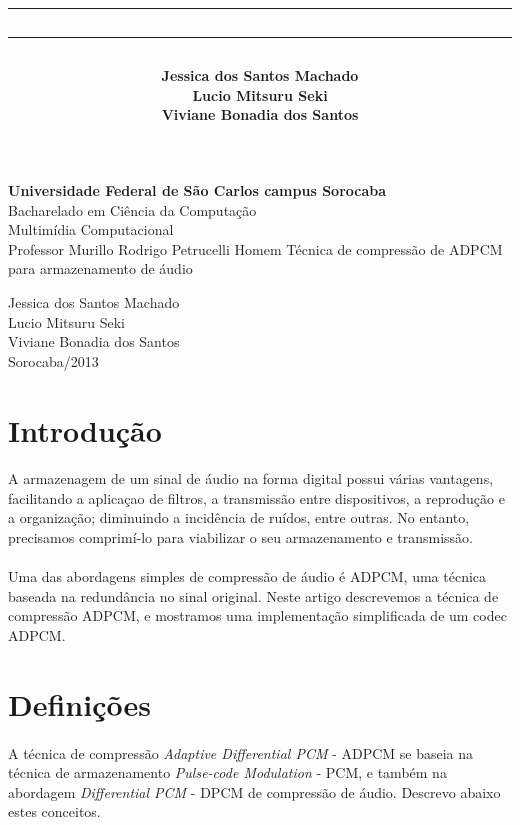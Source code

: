 \documentclass[a4paper,12pt]{article}
\title{\hrule\vspace{1pt}\hrule\vspace{25pt}}
\author{\LARGE \bf 
Jessica dos Santos Machado\\
Lucio Mitsuru Seki\\
Viviane Bonadia dos Santos}
\date{\Large \bf Janeiro de 2012 \vspace{25pt}\hrule\vspace{1pt}\hrule}
\begin{document}
\pagestyle{empty}
\onehalfspacing
\begin{center}
{\Large \bf Universidade Federal de São Carlos campus Sorocaba}\\[15pt]
{\Large Bacharelado em Ciência da Computação}\\[15pt]
{\Large Multimídia Computacional\\ Professor Murillo Rodrigo Petrucelli Homem}
\vfill
\vfill
{\Large Técnica de compressão de ADPCM para armazenamento de áudio}
\vfill
\vfill

{\Large Jessica dos Santos Machado\\
Lucio Mitsuru Seki\\
Viviane Bonadia dos Santos}\\
\bigskip
{Sorocaba/2013}
\end{center}

\newpage

\section{Introdução}

\paragraph{}
A armazenagem de um sinal de áudio na forma digital possui várias vantagens, facilitando a aplicaçao de filtros, a transmissão entre dispositivos, a reprodução e a organização; diminuindo a incidência de ruídos, entre outras. No entanto, precisamos comprimí-lo para viabilizar o seu armazenamento e transmissão.

\paragraph{}
Uma das abordagens simples de compressão de áudio é ADPCM, uma técnica baseada na redundância no sinal original. Neste artigo descrevemos a técnica de compressão ADPCM, e mostramos uma implementação simplificada de um codec ADPCM.

\section{Definições}

\paragraph{}
A técnica de compressão \textit{Adaptive Differential PCM} - ADPCM se baseia na técnica de armazenamento \textit{Pulse-code Modulation} - PCM, e também na abordagem \textit{Differential PCM} - DPCM de compressão de áudio. Descrevo abaixo estes conceitos.
\end{document}
